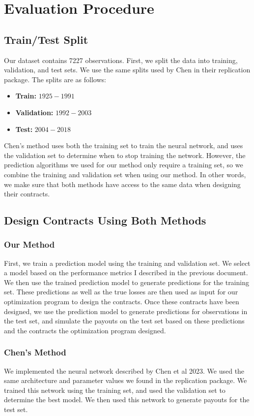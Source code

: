 \documentclass[11pt]{article}
\begin{document}
\section{Evaluation Procedure}
  \subsection{Train/Test Split}
    Our dataset contains 7227 observations. First, we split the data into training, validation, and test sets. We use the same splits used by Chen in their replication package. The splits are as follows: 
    \begin{itemize}
        \item \textbf{Train:} $1925-1991$
        \item \textbf{Validation:} $1992-2003$
        \item \textbf{Test:} $2004-2018$
    \end{itemize}

    Chen's method uses both the training set to train the neural network, and uses the validation set to determine when to stop training the network. However, the prediction algorithms we used for our method only require a training set, so we combine the training and validation set when using our method. In other words, we make sure that both methods have access to the same data when designing their contracts. 
    
  \subsection{Design Contracts Using Both Methods}
    \subsubsection{Our Method}
      First, we train a prediction model using the training and validation set. We select a model based on the performance metrics I described in the previous document. We then use the trained prediction model to generate predictions for the training set. These predictions as well as the true losses are then used as input for our optimization program to design the contracts. Once these contracts have been designed, we use the prediction model to generate predictions for observations in the test set, and simulate the payouts on the test set based on these predictions and the contracts the optimization program designed. 

    \subsubsection{Chen's Method}
      We implemented the neural network described by Chen et al 2023. We used the same architecture and parameter values we found in the replication package. We trained this network using the training set, and used the validation set to determine the best model. We then used this network to generate payouts for the test set. 
      
\end{document}
